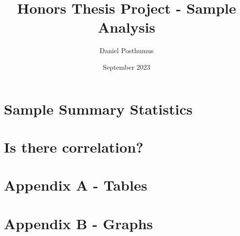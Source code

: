 \documentclass[6pt]{article}
\title{Honors Thesis Project - Sample Analysis}
\author{Daniel Posthumus}
\date{September 2023}
\begin{document}
\maketitle

\section{Sample Summary Statistics}



\section{Is there correlation?}



\section{Appendix A - Tables}












\section{Appendix B - Graphs}
\end{document}
